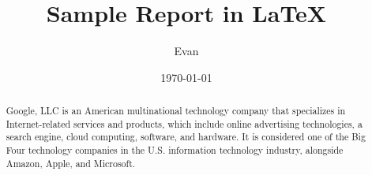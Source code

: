 \documentclass[12pt,a4paper,twoside,openright]{report}
\title{Sample Report in \LaTeX\\}
\author{Evan}
\date{\today}
\begin{document}
\maketitle

\onehalfspacing
{}

\begin{abstract}
	Google, LLC is an American multinational technology company that specializes in Internet-related services and products, which include online advertising technologies, a search engine, cloud computing, software, and hardware. It is considered one of the Big Four technology companies in the U.S. information technology industry, alongside Amazon, Apple, and Microsoft.
\end{abstract}

\tableofcontents
\listoffigures
\listoftables


\doublespacing
{}






\appendix


\singlespacing


\end{document}

